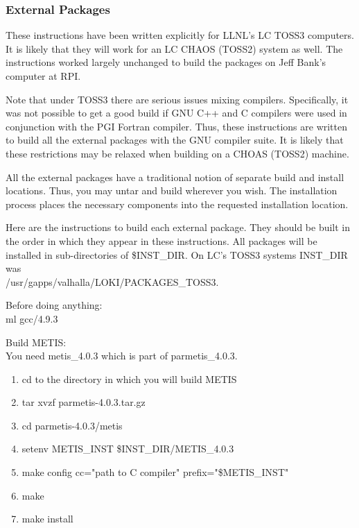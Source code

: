 \documentclass[11pt]{amsart}
\begin{document}
\subsubsection*{External Packages}
These instructions have been written explicitly for LLNL's LC TOSS3 computers.
It is likely that they will work for an LC CHAOS (TOSS2) system as well.  The
instructions worked largely unchanged to build the packages on Jeff Bank's
computer at RPI.

Note that under TOSS3 there are serious issues mixing compilers.  Specifically,
it was not possible to get a good build if GNU C++ and C compilers were used in
conjunction with the PGI Fortran compiler.  Thus, these instructions are
written to build all the external packages with the GNU compiler suite.  It is
likely that these restrictions may be relaxed when building on a CHOAS (TOSS2)
machine.

All the external packages have a traditional notion of separate build and
install locations.  Thus, you may untar and build wherever you wish.  The
installation process places the necessary components into the requested
installation location.

Here are the instructions to build each external package.  They should be built
in the order in which they appear in these instructions.  All packages will
be installed in sub-directories of \$INST\_DIR.  On LC's TOSS3 systems
INST\_DIR was \\
/usr/gapps/valhalla/LOKI/PACKAGES\_TOSS3.

Before doing anything: \\
ml gcc/4.9.3

Build METIS: \\
You need metis\_4.0.3 which is part of parmetis\_4.0.3.
\begin{enumerate}
\item cd to the directory in which you will build METIS
\item tar xvzf parmetis-4.0.3.tar.gz
\item cd parmetis-4.0.3/metis
\item setenv METIS\_INST \$INST\_DIR/METIS\_4.0.3
\item make config cc="path to C compiler" prefix="\$METIS\_INST"
\item make
\item make install
\end{enumerate}
\end{document}
